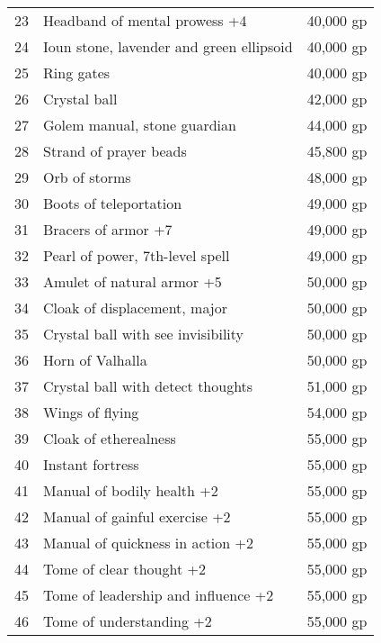 \begin{xtabular}{lll}
23  & Headband of mental prowess +4                  & 40,000 gp    \\
24  & Ioun stone, lavender and green ellipsoid       & 40,000 gp    \\
25  & Ring gates                                     & 40,000 gp    \\
26  & Crystal ball                                   & 42,000 gp    \\
27  & Golem manual, stone guardian                   & 44,000 gp    \\
28  & Strand of prayer beads                         & 45,800 gp    \\
29  & Orb of storms                                  & 48,000 gp    \\
30  & Boots of teleportation                         & 49,000 gp    \\
31  & Bracers of armor +7                            & 49,000 gp    \\
32  & Pearl of power, 7th-level spell                & 49,000 gp    \\
33  & Amulet of natural armor +5                     & 50,000 gp    \\
34  & Cloak of displacement, major                   & 50,000 gp    \\
35  & Crystal ball with see invisibility             & 50,000 gp    \\
36  & Horn of Valhalla                               & 50,000 gp    \\
37  & Crystal ball with detect thoughts              & 51,000 gp    \\
38  & Wings of flying                                & 54,000 gp    \\
39  & Cloak of etherealness                          & 55,000 gp    \\
40  & Instant fortress                               & 55,000 gp    \\
41  & Manual of bodily health +2                     & 55,000 gp    \\
42  & Manual of gainful exercise +2                  & 55,000 gp    \\
43  & Manual of quickness in action +2               & 55,000 gp    \\
44  & Tome of clear thought +2                       & 55,000 gp    \\
45  & Tome of leadership and influence +2            & 55,000 gp    \\
46  & Tome of understanding +2                       & 55,000 gp    \\

\end{xtabular}
